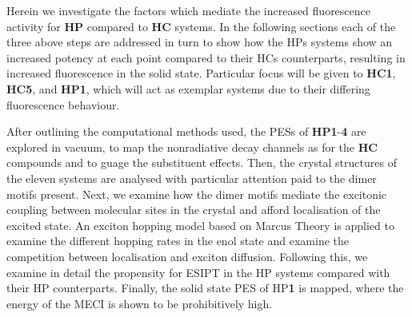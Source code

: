 Herein we investigate the factors which mediate the increased fluorescence activity for \textbf{HP} compared to \textbf{HC} systems. In the following sections each of the three above steps are addressed in turn to show how the \acp{HP} systems show an increased potency at each point compared to their \acp{HC} counterparts, resulting in increased fluorescence in the solid state. Particular focus will be given to \textbf{HC1}, \textbf{HC5}, and \textbf{HP1}, which will act as exemplar systems due to their differing fluorescence behaviour.

After outlining the computational methods used, the \acp{PES} of \textbf{HP1}-\textbf{4} are explored in vacuum, to map the nonradiative decay channels as for the \textbf{HC} compounds and to guage the substituent effects. Then, the crystal structures of the eleven systems are analysed with particular attention paid to the dimer motifs present. Next, we examine how the dimer motifs mediate the excitonic coupling between molecular sites in the crystal and afford localisation of the excited state. An exciton hopping model based on Marcus Theory is applied to examine the different hopping rates in the enol state and examine the competition between localisation and exciton diffusion. Following this, we examine in detail the propensity for ESIPT in the \ac{HP} systems compared with their \ac{HP} counterparts. Finally, the solid state \ac{PES}  of \ac{HP}\textbf{1} is mapped, where the energy of the \ac{MECI} is shown to be prohibitively high.
